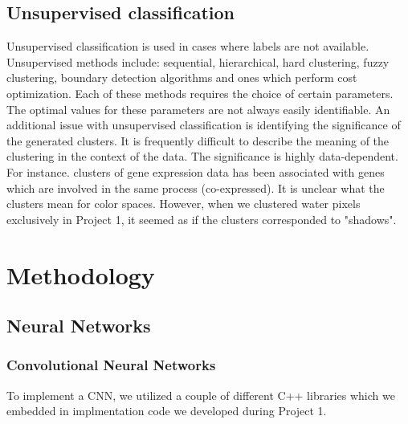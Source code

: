 \documentclass[12pt]{article}
\begin{document}
\subsection{Unsupervised classification}
Unsupervised classification is used in cases where labels are not available. Unsupervised methods include: sequential, hierarchical, hard clustering, fuzzy clustering, boundary detection algorithms and ones which perform cost optimization. Each of these methods requires the choice of certain parameters. The optimal values for these parameters are not always easily identifiable. An additional issue with unsupervised classification is identifying the significance of the generated clusters. It is frequently difficult to describe the meaning of the clustering in the context of the data. The significance is highly data-dependent. For instance. clusters of gene expression data has been associated with genes which are involved in the same process (co-expressed). It is unclear what the clusters mean for color spaces. However, when we clustered water pixels exclusively in Project 1, it seemed as if the clusters corresponded to "shadows".

\section{Methodology}
\subsection{Neural Networks}
\subsubsection{Convolutional Neural Networks}
To implement a CNN, we utilized a couple of different C++ libraries which we embedded in implmentation code we developed during Project 1.
\end{document}
